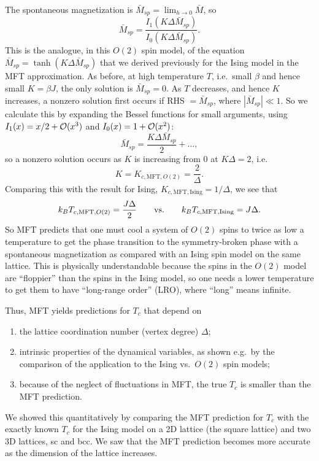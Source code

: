 The spontaneous magnetization is $\bar M_{sp} = \lim_{h\to 0}\bar M$, so
\begin{equation}
  \bar M_{sp} = \frac{I_1(K\Delta\bar M_{sp})}{I_0(K\Delta\bar M_{sp})}.
\end{equation}
This is the analogue, in this $O(2)$ spin model, of the equation
$\bar M_{sp} = \tanh(K\Delta\bar M_{sp})$ that we derived previously for the Ising model in the MFT
approximation. As before, at high temperature $T$, i.e.\ small $\beta$ and hence small $K = \beta J$,
the only solution is $\bar M_{sp} = 0$. As $T$ decreases, and hence $K$ increases, a nonzero solution
first occurs if RHS $=\bar M_{sp}$, where $|\bar M_{sp}|\ll 1$. So we calculate this by expanding the
Bessel functions for small arguments, using $I_1(x) = x/2 + \mathcal{O}(x^3)$ and
$I_0(x) = 1 + \mathcal{O}(x^2)$:
\begin{equation}
  \bar M_{sp} = \frac{K\Delta\bar M_{sp}}{2} + \ldots,
\end{equation}
so a nonzero solution occurs as $K$ is increasing from 0 at $K\Delta = 2$, i.e.
\begin{equation}
  K = K_{c,\text{MFT},O(2)} = \frac{2}{\Delta}.
\end{equation}
Comparing this with the result for Ising, $K_{c,\text{MFT},\text{Ising}} = 1/\Delta$, we see that
\begin{equation}
  k_{B} T_{c,\text{MFT},O(2)} = \frac{J\Delta}{2}\qquad\text{vs.}\qquad k_{B} T_{c,\text{MFT},\text{Ising}} = J\Delta .
\end{equation}
So MFT predicts that one must cool a system of $O(2)$ spins to twice as low a temperature to get the
phase transition to the symmetry-broken phase with a spontaneous magnetization as compared with an
Ising spin model on the same lattice. This is physically understandable because the spins in the
$O(2)$ model are ``floppier'' than the spins in the Ising model, so one needs a lower temperature to
get them to have ``long-range order'' (LRO), where ``long'' means infinite.

Thus, MFT yields predictions for $T_c$ that depend on
\begin{enumerate}[label=(\roman*)]
  \item the lattice coordination number (vertex degree) $\Delta$;
  \item intrinsic properties of the dynamical variables, as shown e.g.\ by the comparison of the
    application to the Ising vs.\ $O(2)$ spin models;
  \item because of the neglect of fluctuations in MFT, the true $T_c$ is smaller than the MFT
    prediction.
\end{enumerate}
We showed this quantitatively by comparing the MFT prediction for $T_c$ with the exactly known
$T_c$ for the Ising model on a 2D lattice (the square lattice) and two 3D lattices, sc and bcc. We
saw that the MFT prediction becomes more accurate as the dimension of the lattice increases.


